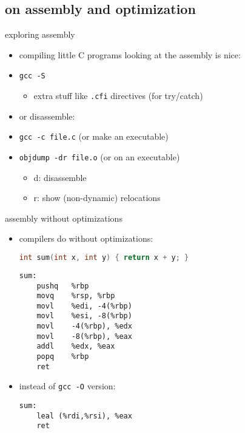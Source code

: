
\subsection{on assembly and optimization}

\begin{frame}{exploring assembly}
\begin{itemize}
\item compiling little C programs looking at the assembly is nice:
\item {\tt gcc -S }
    \begin{itemize}
    \item extra stuff like {\tt .cfi} directives (for try/catch)
    \end{itemize}
\vspace{.5cm}
\item or disassemble:
\item {\tt gcc  -c file.c} (or make an executable)
\item {\tt objdump -dr file.o} (or on an executable) 
    \begin{itemize}
    \item d: disassemble
    \item r: show (non-dynamic) relocations
    \end{itemize}
\end{itemize}
\end{frame}

\begin{frame}[fragile,label=noOpt]{assembly without optimizations}
\begin{itemize}
\item compilers do  without optimizations:
\begin{lstlisting}[language=C, style=smaller]
int sum(int x, int y) { return x + y; }
\end{lstlisting}
\vspace{-.125cm}
\begin{lstlisting}
sum:
    pushq   %rbp
    movq    %rsp, %rbp
    movl    %edi, -4(%rbp)
    movl    %esi, -8(%rbp)
    movl    -4(%rbp), %edx
    movl    -8(%rbp), %eax
    addl    %edx, %eax
    popq    %rbp
    ret
\end{lstlisting}
\vspace{-.3cm}
\item instead of {\tt gcc -O} version:
\vspace{-.1cm}
\begin{lstlisting}
sum:
    leal (%rdi,%rsi), %eax
    ret
\end{lstlisting}
\end{itemize}
\end{frame}

